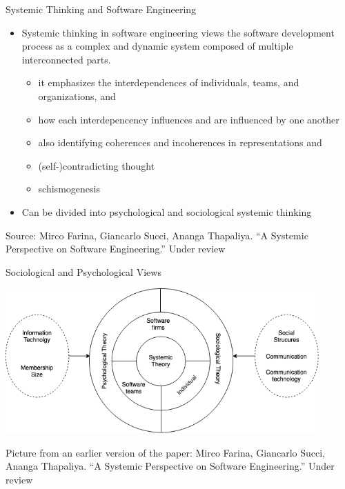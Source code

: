 \documentclass{beamer}
\begin{document}
\begin{frame}
{\centerline{Systemic Thinking and Software Engineering}}
\begin{itemize}
    \item Systemic thinking in software engineering views the software development process as a complex and dynamic system composed of multiple interconnected parts.
    \begin{itemize}
    \item it emphasizes the interdependences of individuals, teams, and organizations, and 
    \item how each interdepencency influences and are influenced by one another 
    \item also identifying coherences and incoherences in representations and
    \item (self-)contradicting thought
    \item schismogenesis
\end{itemize} 
    \item Can be divided into psychological and sociological systemic thinking
\end{itemize} 

\begin{center}
    \tiny{Source: Mirco Farina, Giancarlo Succi, Ananga Thapaliya. ``A Systemic Perspective on Software Engineering.'' Under review}
\end{center}

\end{frame}

\begin{frame}
{\centerline{Sociological and Psychological Views}}

\begin{center}
 \includegraphics[width=12cm]{P2023.AIBCCSS.ExtendedMindDistributedCognitionSystemicThinking/SociologicalPsychologicalST.png}
 
 \end{center}

\begin{center}
    \tiny{Picture from an earlier version of the paper: Mirco Farina, Giancarlo Succi, Ananga Thapaliya. ``A Systemic Perspective on Software Engineering.'' Under review}
 \end{center}

\end{frame}
\end{document}
